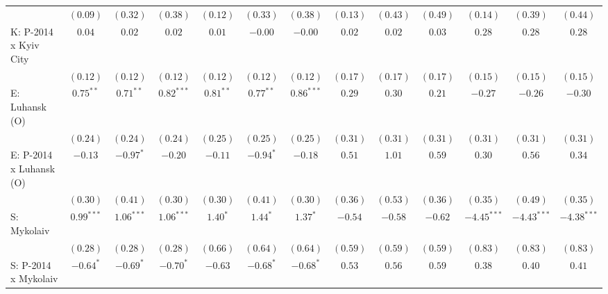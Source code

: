 \begin{table}
\begin{center}
\begin{tiny}
\begin{tabular}{l c c c c c c c c c c c c}
                            & $(0.09)$      & $(0.32)$      & $(0.38)$      & $(0.12)$     & $(0.33)$     & $(0.38)$     & $(0.13)$      & $(0.43)$      & $(0.49)$       & $(0.14)$      & $(0.39)$      & $(0.44)$      \\
K: P-2014 x Kyiv City       & $0.04$        & $0.02$        & $0.02$        & $0.01$       & $-0.00$      & $-0.00$      & $0.02$        & $0.02$        & $0.03$         & $0.28$        & $0.28$        & $0.28$        \\
                            & $(0.12)$      & $(0.12)$      & $(0.12)$      & $(0.12)$     & $(0.12)$     & $(0.12)$     & $(0.17)$      & $(0.17)$      & $(0.17)$       & $(0.15)$      & $(0.15)$      & $(0.15)$      \\
E: Luhansk (O)              & $0.75^{**}$   & $0.71^{**}$   & $0.82^{***}$  & $0.81^{**}$  & $0.77^{**}$  & $0.86^{***}$ & $0.29$        & $0.30$        & $0.21$         & $-0.27$       & $-0.26$       & $-0.30$       \\
                            & $(0.24)$      & $(0.24)$      & $(0.24)$      & $(0.25)$     & $(0.25)$     & $(0.25)$     & $(0.31)$      & $(0.31)$      & $(0.31)$       & $(0.31)$      & $(0.31)$      & $(0.31)$      \\
E: P-2014 x Luhansk (O)     & $-0.13$       & $-0.97^{*}$   & $-0.20$       & $-0.11$      & $-0.94^{*}$  & $-0.18$      & $0.51$        & $1.01$        & $0.59$         & $0.30$        & $0.56$        & $0.34$        \\
                            & $(0.30)$      & $(0.41)$      & $(0.30)$      & $(0.30)$     & $(0.41)$     & $(0.30)$     & $(0.36)$      & $(0.53)$      & $(0.36)$       & $(0.35)$      & $(0.49)$      & $(0.35)$      \\
S: Mykolaiv                 & $0.99^{***}$  & $1.06^{***}$  & $1.06^{***}$  & $1.40^{*}$   & $1.44^{*}$   & $1.37^{*}$   & $-0.54$       & $-0.58$       & $-0.62$        & $-4.45^{***}$ & $-4.43^{***}$ & $-4.38^{***}$ \\
                            & $(0.28)$      & $(0.28)$      & $(0.28)$      & $(0.66)$     & $(0.64)$     & $(0.64)$     & $(0.59)$      & $(0.59)$      & $(0.59)$       & $(0.83)$      & $(0.83)$      & $(0.83)$      \\
S: P-2014 x Mykolaiv        & $-0.64^{*}$   & $-0.69^{*}$   & $-0.70^{*}$   & $-0.63$      & $-0.68^{*}$  & $-0.68^{*}$  & $0.53$        & $0.56$        & $0.59$         & $0.38$        & $0.40$        & $0.41$        \\

\end{tabular}
\end{tiny}
\end{center}
\end{table}
